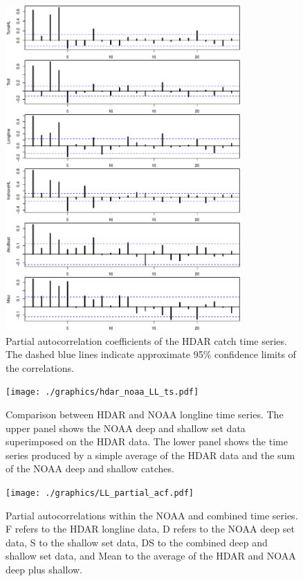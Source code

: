 \documentclass[12pt,letterpaper,twoside]{article}
\begin{document}
\begin{figure}
\begin{center}
\includegraphics[width=0.8\textwidth]{./graphics/partial_acf.pdf}
\caption{\label{fig:catchPACF}
Partial autocorrelation coefficients of the HDAR catch time series. The
dashed blue lines indicate approximate 95\% confidence limits of the
correlations.}
\end{center}
\end{figure}

\begin{figure}
\begin{center}
\texttt{[image: ./graphics/hdar\_noaa\_LL\_ts.pdf]}
\caption{\label{fig:hdarnoaaLLTS}
Comparison between HDAR and NOAA longline time series. The upper panel
shows the NOAA deep and shallow set data superimposed on the HDAR
data. The lower panel shows the time series produced by a simple
average of the HDAR data and the sum of the NOAA deep and shallow
catches.}
\end{center}
\end{figure}

\begin{figure}
\begin{center}
\texttt{[image: ./graphics/LL\_partial\_acf.pdf]}
\caption{\label{fig:LLpartialacf}
Partial autocorrelations within the NOAA and combined time
series. F refers to the HDAR longline data, D refers to the NOAA deep
set data, S to the shallow set data,
DS to the combined deep and shallow set data, and Mean to the average
of the HDAR and NOAA deep plus shallow.
}
\end{center}
\end{figure}
\end{document}
